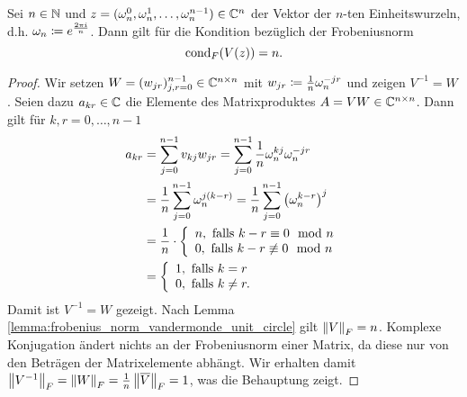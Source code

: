 \begin{lemma}
    \label{lemma:frobenius_condition_unit_roots}
    Sei $n \in \N$ und $z = (\wn^0, \wn^1, \dots, \wn^{n-1})  \in \Cn$ der Vektor der
    $n$-ten Einheitswurzeln, d.h. $\wn \defeq e^{\frac{2 \pi i}{n}}$.
    Dann gilt für die Kondition bezüglich der Frobeniusnorm
    \[
        \cond[F]{\Vand{z}} = n.
    \]
\end{lemma}
\begin{proof}
    Wir setzen $W = (w_{jr})_{j,r=0}^{n-1} \in \C^{n\times n}$ mit
    $w_{jr} \defeq \frac{1}{n} \wn^{-jr}$
    und zeigen $V^{-1} = W$.
    Seien dazu $a_{kr} \in \C$ die Elemente des Matrixproduktes
    $A = V W \in \C^{n\times n}$.
    Dann gilt für $k, r = 0, \dots, n-1$
    \[
        \begin{split}
            a_{kr}
            &= \sum_{j=0}^{n-1} v_{kj} w_{jr}
            = \sum_{j=0}^{n-1} \frac{1}{n} \wn^{kj} \wn^{-jr} \\
            &= \frac{1}{n} \sum_{j=0}^{n-1} \wn^{j (k-r)}
            = \frac{1}{n} \sum_{j=0}^{n-1} \left( \wn^{k-r} \right)^j\\
            &= \frac{1}{n} \cdot \left\{
                \begin{array}{ll}
                    n, \text{ falls } k-r \equiv 0 \mod n\\
                    0, \text{ falls } k-r \not\equiv 0 \mod n
                \end{array}
              \right.\\
            &= \left\{
                \begin{array}{ll}
                    1, \text{ falls } k = r \\
                    0, \text{ falls } k \neq r .
                \end{array}
              \right.
        \end{split}
    \]
    Damit ist $V^{-1} = W$ gezeigt.
    Nach Lemma \ref{lemma:frobenius_norm_vandermonde_unit_circle} gilt $\norm{V}_F = n$.
    Komplexe Konjugation ändert nichts an der Frobeniusnorm einer Matrix, da
    diese nur von den Beträgen der Matrixelemente abhängt.
    Wir erhalten damit $\norm{V^{-1}}_F = \norm{W}_F = \frac{1}{n}
    \norm{\overline V}_F = 1$, was die Behauptung zeigt.
\end{proof}

